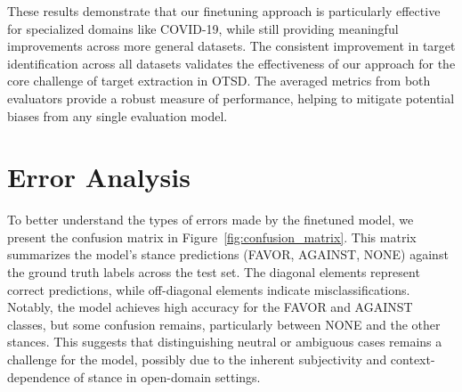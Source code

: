 \documentclass[twocolumn,11pt,letterpaper]{article}
\begin{document}
These results demonstrate that our finetuning approach is particularly effective for specialized domains like COVID-19, while still providing meaningful improvements across more general datasets. The consistent improvement in target identification across all datasets validates the effectiveness of our approach for the core challenge of target extraction in OTSD. The averaged metrics from both evaluators provide a robust measure of performance, helping to mitigate potential biases from any single evaluation model.

\section{Error Analysis}

To better understand the types of errors made by the finetuned model, we present the confusion matrix in Figure~\ref{fig:confusion_matrix}. This matrix summarizes the model's stance predictions (FAVOR, AGAINST, NONE) against the ground truth labels across the test set. The diagonal elements represent correct predictions, while off-diagonal elements indicate misclassifications. Notably, the model achieves high accuracy for the FAVOR and AGAINST classes, but some confusion remains, particularly between NONE and the other stances. This suggests that distinguishing neutral or ambiguous cases remains a challenge for the model, possibly due to the inherent subjectivity and context-dependence of stance in open-domain settings.

\end{document}
